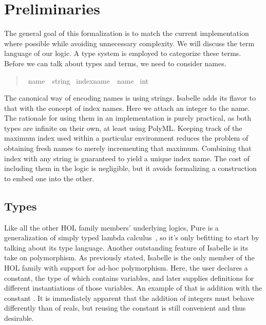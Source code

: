 \chapter{Preliminaries}\label{chapter:preliminaries}

The general goal of this formalization is to match the current implementation where possible while avoiding unnecessary complexity.
We will discuss the term language of our logic.
A type system is employed to categorize these terms.
Before we can talk about types and terms, we need to consider names.

\begin{quote}
    \begin{isabelle}
        \ name\ {\isacharequal}\ string \isanewline
        \ indexname\ {\isacharequal}\ name {\isasymtimes}\ int
    \end{isabelle}
\end{quote}

The canonical way of encoding names is using strings.
Isabelle adds its flavor to that with the concept of index names.
Here we attach an integer to the name.
The rationale for using them in an implementation is purely practical, as both types are infinite on their own, at least using PolyML\@.
Keeping track of the maximum index used within a particular environment reduces the problem of obtaining fresh names to merely incrementing that maximum.
Combining that index with any string is guaranteed to yield a unique index name.
The cost of including them in the logic is negligible, but it avoids formalizing a construction to embed one into the other.

\section{Types}
Like all the other HOL family members' underlying logics, Pure is a generalization of simply typed lambda calculus~\parencite{Church40}, so it's only befitting to start by talking about its type language.
Another outstanding feature of Isabelle is its take on polymorphism.
As previously stated, Isabelle is the only member of the HOL family with support for ad-hoc polymorphism.
Here, the user declares a constant, the type of which contains variables, and later supplies definitions for different instantiations of those variables.
An example of that is addition with the constant .
It is immediately apparent that the addition of integers must behave differently than of reals, but reusing the \isa{(+)} constant is still convenient and thus desirable.

